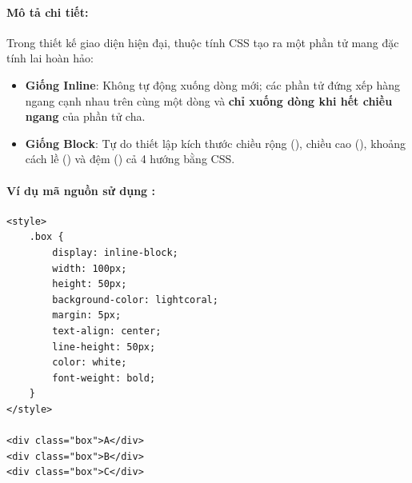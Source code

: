 \paragraph{Mô tả chi tiết:}
Trong thiết kế giao diện hiện đại, thuộc tính CSS  tạo ra một phần tử mang đặc tính lai hoàn hảo:
\begin{itemize}[leftmargin=1.8em, itemsep=3pt, parsep=0pt]
    \item \textbf{Giống Inline}: Không tự động xuống dòng mới; các phần tử đứng xếp hàng ngang cạnh nhau trên cùng một dòng và \textbf{chỉ xuống dòng khi hết chiều ngang} của phần tử cha.
    \item \textbf{Giống Block}: Tự do thiết lập kích thước chiều rộng (), chiều cao (), khoảng cách lề () và đệm () cả 4 hướng bằng CSS.
\end{itemize}

\paragraph{Ví dụ mã nguồn sử dụng :}
\begin{codeWindow}
\begin{lstlisting}[language=HTML5]
<style>
    .box {
        display: inline-block;
        width: 100px;
        height: 50px;
        background-color: lightcoral;
        margin: 5px;
        text-align: center;
        line-height: 50px;
        color: white;
        font-weight: bold;
    }
</style>

<div class="box">A</div>
<div class="box">B</div>
<div class="box">C</div>
\end{lstlisting}
\end{codeWindow}

\begin{browserWindow}
\centering\sffamily
{} \quad
{} \quad
{}
\end{browserWindow}

